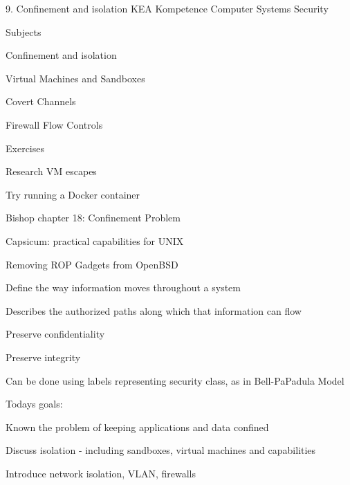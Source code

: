 \documentclass[Screen16to9,17pt]{foils}
\begin{document}
\mytitlepage
{9. Confinement and isolation}
{KEA Kompetence Computer Systems Security}



\begin{list1}
\item Subjects
\begin{list2}
\item Confinement and isolation
\item Virtual Machines and Sandboxes
\item Covert Channels
\item Firewall Flow Controls
\end{list2}
\item Exercises
\begin{list2}
\item Research VM escapes
\item Try running a Docker container
\end{list2}
\end{list1}




\begin{list1}
\item Bishop chapter 18: Confinement Problem
\item Capsicum: practical capabilities for UNIX
\item Removing ROP Gadgets from OpenBSD
\end{list1}


\begin{list1}
\item Define the way information moves throughout a system
\item Describes the authorized paths along which that information can flow
\begin{list2}
\item Preserve confidentiality
\item Preserve integrity
\end{list2}
\item Can be done using labels representing security class, as in Bell-PaPadula Model
\end{list1}



Todays goals:
\begin{list2}
\item Known the problem of keeping applications and data confined
\item Discuss isolation - including sandboxes, virtual machines and capabilities
\item Introduce network isolation, VLAN, firewalls
\end{list2}
\end{document}
